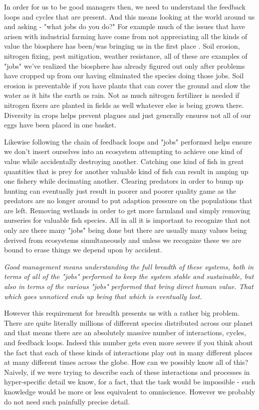 \documentclass[11pt,a5paper]{article}
\begin{document}
In order for us to be good managers then, we need to understand the feedback loops and cycles that are present. And this means looking at the world around us and asking - "what jobs do you do?" For example much of the issues that have arisen with industrial farming have come from not appreciating all the kinds of value the biosphere has been/was bringing us in the first place \cite{biomimicry}. Soil erosion, nitrogen fixing, pest mitigation, weather resistance, all of these are examples of "jobs" we've realized the biosphere has already figured out only after problems have cropped up from our having eliminated the species doing those jobs. Soil erosion is preventable if you have plants that can cover the ground and slow the water as it hits the earth as rain. Not as much nitrogen fertilizer is needed if nitrogen fixers are planted in fields as well whatever else is being grown there. Diversity in crops helps prevent plagues and just generally ensures not all of our eggs have been placed in one basket.

Likewise following the chain of feedback loops and "jobs" performed helps ensure we don't insert ourselves into an ecosystem attempting to achieve one kind of value while accidentally destroying another. Catching one kind of fish in great quantities that is prey for another valuable kind of fish can result in amping up one fishery while decimating another. Clearing predators in order to bump up hunting can eventually just result in poorer and poorer quality game as the predators are no longer around to put adaption pressure on the populations that are left. Removing wetlands in order to get more farmland and simply removing nurseries for valuable fish species. All in all it is important to recognize that not only are there many "jobs" being done but there are usually many values being derived from ecosystems simultaneously and unless we recognize these we are bound to erase things we depend upon by accident. \newline

\textit{Good management means understanding the full breadth of these systems, both in terms of all of the "jobs" performed to keep the system stable and sustainable, but also in terms of the various "jobs" performed that bring direct human value. That which goes unnoticed ends up being that which is eventually lost. }\newline

However this requirement for breadth presents us with a rather big problem. There are quite literally millions of different species distributed across our planet and that means there are an absolutely massive number of interactions, cycles, and feedback loops. Indeed this number gets even more severe if you think about the fact that each of these kinds of interactions play out in many different places at many different times across the globe. How can we possibly know all of this? Naively, if we were trying to describe each of these interactions and processes in hyper-specific detail we know, for a fact, that the task would be impossible - such knowledge would be more or less equivalent to omniscience. However we probably do not need such painfully precise detail. 
\end{document}
